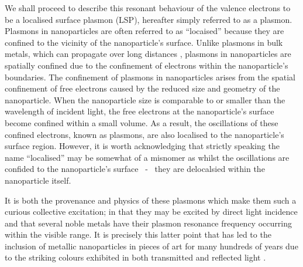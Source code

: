 We shall proceed to describe this resonant behaviour of the valence electrons to be a localised surface plasmon (LSP), hereafter simply referred to as a plasmon. Plasmons in nanoparticles are often referred to as ``locaised'' because they are confined to the vicinity of the nanoparticle's surface. Unlike plasmons in bulk metals, which can propagate over long distances \cite{ZAYATS2005131}, plasmons in nanoparticles are spatially confined due to the confinement of electrons within the nanoparticle's boundaries. The confinement of plasmons in nanoparticles arises from the spatial confinement of free electrons caused by the reduced size and geometry of the nanoparticle. When the nanoparticle size is comparable to or smaller than the wavelength of incident light, the free electrons at the nanoparticle's surface become confined within a small volume. As a result, the oscillations of these confined electrons, known as plasmons, are also localised to the nanoparticle's surface region. However, it is worth acknowledging that strictly speaking the name ``localised'' may be somewhat of a misnomer as whilst the oscillations are confided to the nanoparticle's surface ~-~ they are delocalsied within the nanoparticle itself.

It is both the provenance and physics of these plasmons which make them such a curious collective excitation; in that they may be excited by direct light incidence and that several noble metals have their plasmon resonance frequency occurring within the visible range. It is precisely this latter point that has led to the inclusion of metallic nanoparticles in pieces of art for many hundreds of years due to the striking colours exhibited in both transmitted and reflected light \cite{AuPlasmonRev}.

